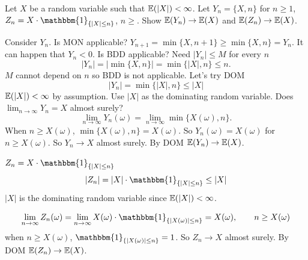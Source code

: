 \documentclass[10pt, a4paper]{article}
\begin{document}
\begin{problem}
    Let $X$ be a random variable such that $\mathbb{E}(|X|) < \infty$.
    Let $Y_n = \{X, n\}$ for $n \geq 1$,
    $Z_n = X\cdot\mathbbm{1}_{\{|X| \leq n\}}$,
    $n \geq $.
    Show $\mathbb{E}(Y_n) \to \mathbb{E}(X)$ and $\mathbb{E}(Z_n) \to \mathbb{E}(X)$.

    \begin{solution}
        Consider $Y_n$.
        Is MON applicable?
        $Y_{n + 1} = \min\{X, n + 1\} \geq \min\{X, n\} = Y_n$.
        It can happen that $Y_n < 0$.
        Is BDD applicable?
        Need $|Y_n| \leq M$ for every $n$
        \[
        |Y_n| = |\min\{X, n\}| = \min\{|X|, n\} \leq n.
        \]
        $M$ cannot depend on $n$ so BDD is not applicable.
        Let's try DOM
        \[
        |Y_n| = \min\{|X|, n\} \leq |X|
        \]
        $\mathbb{E}(|X|) < \infty$ by assumption.
        Use $|X|$ as the dominating random variable.
        Does $\lim_{n \to \infty}Y_n = X$ almost surely?
        \[
        \lim_{n \to \infty}Y_n(\omega) = \lim_{n \to \infty}\min\{X(\omega), n\}.
        \]
        When $n \geq X(\omega)$,
        $\min\{X(\omega), n\} = X(\omega)$.
        So $Y_n(\omega) = X(\omega)$ for $n \geq X(\omega)$.
        So $Y_n \to X$ almost surely.
        By DOM $\mathbb{E}(Y_n) \to \mathbb{E}(X)$.

        $Z_n = X\cdot\mathbbm{1}_{\{|X| \leq n\}}$
        \[
        |Z_n| = |X|\cdot\mathbbm{1}_{\{|X| \leq n\}} \leq |X|
        \]
        $|X|$ is the dominating random variable since $\mathbb{E}(|X|) < \infty$.

        \[
        \lim_{n \to \infty}Z_n(\omega) = \lim_{n \to \infty}X(\omega)\cdot\mathbbm{1}_{\{|X(\omega)| \leq n\}} = X(\omega),\qquad n \geq X(\omega)
        \]
        when $n \geq X(\omega)$,
        $\mathbbm{1}_{\{|X(\omega)| \leq n\}} = 1$.
        So $Z_n \to X$ almost surely.
        By DOM $\mathbb{E}(Z_n) \to \mathbb{E}(X)$.
    \end{solution}
\end{problem}

\newpage
\end{document}
